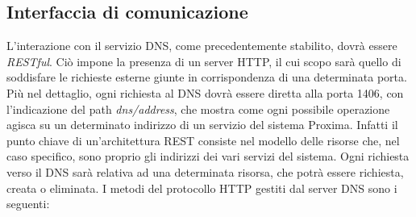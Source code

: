 \documentclass[a4paper,12pt]{report}
\begin{document}
\subsection{Interfaccia di comunicazione}
L'interazione con il servizio DNS, come precedentemente stabilito, dovrà essere \emph{RESTful}. Ciò impone la presenza di un server HTTP, il cui scopo sarà quello di soddisfare le richieste esterne giunte in corrispondenza di una determinata porta. Più nel dettaglio, ogni richiesta al DNS dovrà essere diretta alla porta 1406, con l'indicazione del path \emph{dns/address}, che mostra come ogni possibile operazione agisca su un determinato indirizzo di un servizio del sistema Proxima. Infatti il punto chiave di un'architettura REST consiste nel modello delle risorse che, nel caso specifico, sono proprio gli indirizzi dei vari servizi del sistema. Ogni richiesta verso il DNS sarà relativa ad una determinata risorsa, che potrà essere richiesta, creata o eliminata. I metodi del protocollo HTTP gestiti dal server DNS sono i seguenti:
\end{document}
